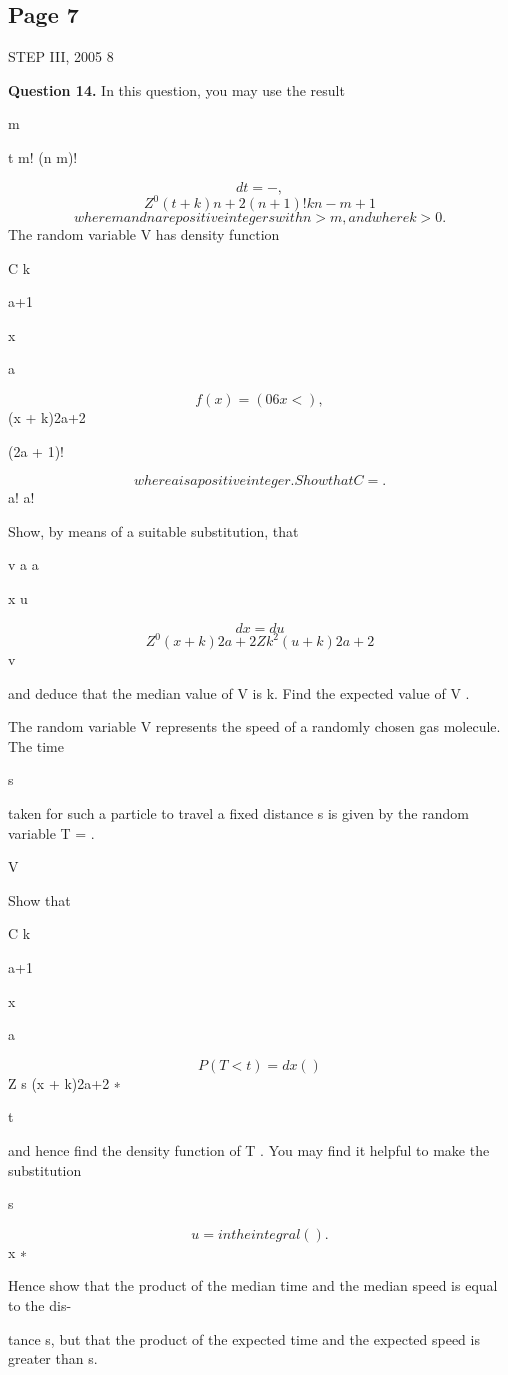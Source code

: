 \documentclass[12pt]{article}
\begin{document}
\subsection*{Page 7}
\begin{flushleft}
STEP III, 2005 8\par
\bigskip\textbf{Question 14.} In this question, you may use the result\par
\infty m\par
t m! (n m)!\par
\[dt = - ,\]
\[Z^0 (t + k)n+2 (n + 1)! kn-m+1\]
\[where m and n are positive integers with n > m , and where k > 0 .\]
The random variable V has density function\par
C k\par
a+1\par
x\par
a\par
\[f (x) = (0 6 x < ) ,\]
(x + k)2a+2 \infty\par
(2a + 1)!\par
\[where a is a positive integer. Show that C = .\]
a! a!\par
Show, by means of a suitable substitution, that\par
v a \infty a\par
x u\par
\[dx = du\]
\[Z^0 (x + k)2a+2 Z k^2 (u + k)2a+2\]
v\par
and deduce that the median value of V is k. Find the expected value of V .\par
The random variable V represents the speed of a randomly chosen gas molecule. The time\par
s\par
taken for such a particle to travel a fixed distance s is given by the random variable T = .\par
V\par
Show that\par
\infty\par
C k\par
a+1\par
x\par
a\par
\[P(T < t) = dx ( )\]
Z s (x + k)2a+2 ∗\par
t\par
and hence find the density function of T . You may find it helpful to make the substitution\par
s\par
\[u = in the integral ( ).\]
x ∗\par
Hence show that the product of the median time and the median speed is equal to the dis-\par
tance s, but that the product of the expected time and the expected speed is greater than s.\par
\end{flushleft}
\end{document}
